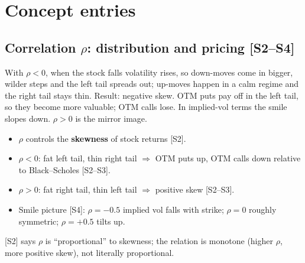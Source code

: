 \documentclass[10pt]{article}
\begin{document}
\section{Concept entries}

\subsection{Correlation $\rho$: distribution and pricing [S2--S4]}
\begin{idea}
With $\rho<0$, when the stock falls volatility rises, so down-moves come in bigger, wilder steps and the left tail spreads out; up-moves happen in a calm regime and the right tail stays thin. Result: negative skew. OTM puts pay off in the left tail, so they become more valuable; OTM calls lose. In implied-vol terms the smile slopes down. $\rho>0$ is the mirror image.
\end{idea}
\begin{itemize}
\item $\rho$ controls the \textbf{skewness} of stock returns [S2].
\item $\rho<0$: fat left tail, thin right tail $\Rightarrow$ OTM puts up, OTM calls down relative to Black--Scholes [S2--S3].
\item $\rho>0$: fat right tail, thin left tail $\Rightarrow$ positive skew [S2--S3].
\item Smile picture [S4]: $\rho=-0.5$ implied vol falls with strike; $\rho=0$ roughly symmetric; $\rho=+0.5$ tilts up.
\end{itemize}
\begin{exam}
\flag{} [S2] says $\rho$ is ``proportional'' to skewness; the relation is monotone (higher $\rho$, more positive skew), not literally proportional.
\end{exam}
\end{document}
